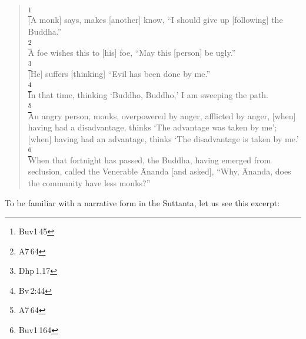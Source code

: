 \begin{quote}
\footnote{Buv1\,45}\\
{[A monk] says, makes [another] know, ``I should give up [following] the Buddha.''}\\[1.5mm]
\footnote{A7\,64}\\
{A foe wishes this to [his] foe, ``May this [person] be ugly.''}\\[1.5mm]
\footnote{Dhp\,1.17}\\
{[He] suffers [thinking] ``Evil has been done by me.''}\\[1.5mm]
\footnote{Bv\,2:44}\\
{In that time, thinking `Buddho, Buddho,' I am sweeping the path.}\\[1.5mm]
\footnote{A7\,64}\\
{An angry person, monks, overpowered by anger, afflicted by anger, [when] having had a disadvantage, thinks `The advantage was taken by me'; [when] having had an advantage, thinks `The disadvantage is taken by me.'}\\[1.5mm]
\footnote{Buv1\,164}\\
{When that fortnight has passed, the Buddha, having emerged from seclusion, called the Venerable \=Ananda [and asked], ``Why, \=Ananda, does the community have less monks?''}\\[1.5mm]
\end{quote}

To be familiar with a narrative form in the Suttanta, let us see this excerpt:

